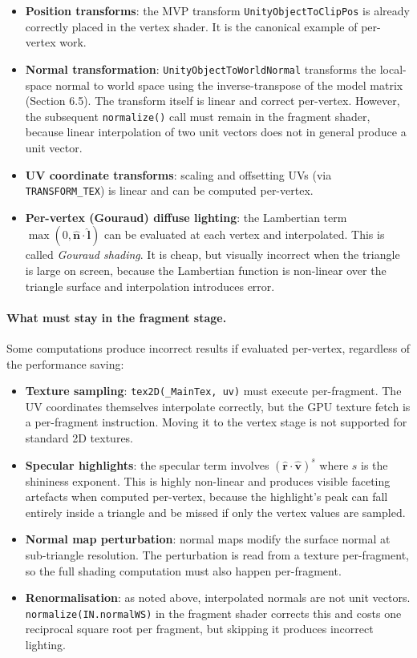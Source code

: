 \documentclass[11pt]{article}
\begin{document}
\begin{itemize}
    \item \textbf{Position transforms}: the MVP transform \texttt{UnityObjectToClipPos} is already correctly placed in the vertex shader. It is the canonical example of per-vertex work.
    \item \textbf{Normal transformation}: \texttt{UnityObjectToWorldNormal} transforms the local-space normal to world space using the inverse-transpose of the model matrix (Section 6.5). The transform itself is linear and correct per-vertex. However, the subsequent \texttt{normalize()} call must remain in the fragment shader, because linear interpolation of two unit vectors does not in general produce a unit vector.
    \item \textbf{UV coordinate transforms}: scaling and offsetting UVs (via \texttt{TRANSFORM\_TEX}) is linear and can be computed per-vertex.
    \item \textbf{Per-vertex (Gouraud) diffuse lighting}: the Lambertian term $\max(0, \hat{\mathbf{n}} \cdot \hat{\mathbf{l}})$ can be evaluated at each vertex and interpolated. This is called \emph{Gouraud shading}. It is cheap, but visually incorrect when the triangle is large on screen, because the Lambertian function is non-linear over the triangle surface and interpolation introduces error.
\end{itemize}

\paragraph{What must stay in the fragment stage.}

Some computations produce incorrect results if evaluated per-vertex, regardless of the performance saving:

\begin{itemize}
    \item \textbf{Texture sampling}: \texttt{tex2D(\_MainTex, uv)} must execute per-fragment. The UV coordinates themselves interpolate correctly, but the GPU texture fetch is a per-fragment instruction. Moving it to the vertex stage is not supported for standard 2D textures.
    \item \textbf{Specular highlights}: the specular term involves $\left(\hat{\mathbf{r}} \cdot \hat{\mathbf{v}}\right)^s$ where $s$ is the shininess exponent. This is highly non-linear and produces visible faceting artefacts when computed per-vertex, because the highlight's peak can fall entirely inside a triangle and be missed if only the vertex values are sampled.
    \item \textbf{Normal map perturbation}: normal maps modify the surface normal at sub-triangle resolution. The perturbation is read from a texture per-fragment, so the full shading computation must also happen per-fragment.
    \item \textbf{Renormalisation}: as noted above, interpolated normals are not unit vectors. \texttt{normalize(IN.normalWS)} in the fragment shader corrects this and costs one reciprocal square root per fragment, but skipping it produces incorrect lighting.
\end{itemize}
\end{document}
